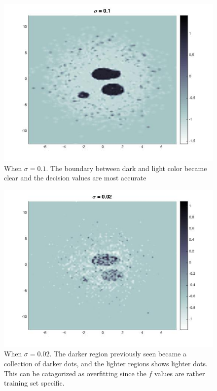 \documentclass[twoside]{article}
\theoremstyle{definition}
\theoremstyle{definition}
\theoremstyle{remark}
\begin{document}
\begin{figure}[H]
\centering
\includegraphics[width=120mm]{sigma_01.jpg}
\caption{ When $\sigma = 0.1$. The boundary between dark and light color became clear and the decision values are most accurate\label{problem2Pic4}}
\end{figure}

\begin{figure}[H]
\centering
\includegraphics[width=120mm]{sigma_002.jpg}
\caption{ When $\sigma = 0.02$. The darker region previously seen became a collection of darker dots, and the lighter regions shows lighter dots. This can be catagorized as overfitting since the $f$ values are rather training set specific.\label{problem2Pic5}}
\end{figure}
\end{document}
